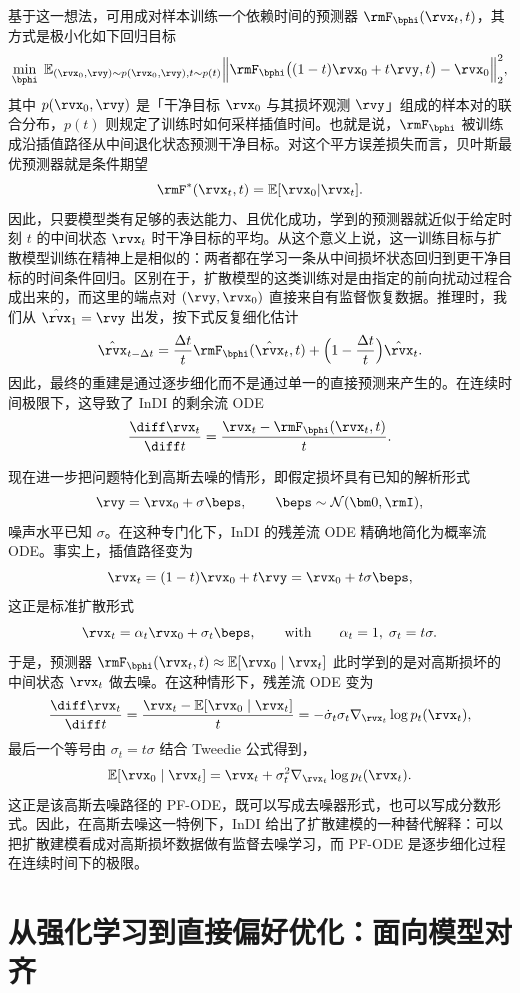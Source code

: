 基于这一想法，可用成对样本训练一个依赖时间的预测器 $\rmF_{\bphi}(\rvx_t,t)$，其方式是极小化如下回归目标
\[
\min_{\bphi}\;
\mathbb E_{(\rvx_0,\rvy)\sim p(\rvx_0,\rvy),  t\sim p(t)}
\Bigl\|
\rmF_{\bphi}\bigl((1-t)\rvx_0+t\rvy, t\bigr)-\rvx_0
\Bigr\|_2^2,
\]
其中 $p(\rvx_0,\rvy)$ 是「干净目标 $\rvx_0$ 与其损坏观测 $\rvy$」组成的样本对的联合分布，$p(t)$ 则规定了训练时如何采样插值时间。也就是说，$\rmF_{\bphi}$ 被训练成沿插值路径从中间退化状态预测干净目标。对这个平方误差损失而言，贝叶斯最优预测器就是条件期望
\[
\rmF^*(\rvx_t,t)=\mathbb E[\rvx_0|\rvx_t].
\]
因此，只要模型类有足够的表达能力、且优化成功，学到的预测器就近似于给定时刻 $t$ 的中间状态 $\rvx_t$ 时干净目标的平均。从这个意义上说，这一训练目标与扩散模型训练在精神上是相似的：两者都在学习一条从中间损坏状态回归到更干净目标的时间条件回归。区别在于，扩散模型的这类训练对是由指定的前向扰动过程合成出来的，而这里的端点对 $(\rvy,\rvx_0)$ 直接来自有监督恢复数据。推理时，我们从 $\hat{\rvx}_1=\rvy$ 出发，按下式反复细化估计
\[
\hat{\rvx}_{t-\Delta t}
=
\frac{\Delta t}{t}\rmF_{\bphi}(\hat{\rvx}_t,t)
+
\Bigl(1-\frac{\Delta t}{t}\Bigr)\hat{\rvx}_t.
\]
因此，最终的重建是通过逐步细化而不是通过单一的直接预测来产生的。在连续时间极限下，这导致了 InDI 的剩余流 ODE
\[
\frac{\diff \rvx_t}{\diff t}
=
\frac{\rvx_t-\rmF_{\bphi}(\rvx_t,t)}{t}.
\]

现在进一步把问题特化到高斯去噪的情形，即假定损坏具有已知的解析形式
\[
\rvy=\rvx_0+\sigma\beps,
\qquad \beps\sim\mathcal N(\bm 0,\rmI),
\]
噪声水平已知 \(\sigma\)。在这种专门化下，InDI 的残差流 ODE 精确地简化为概率流 ODE。事实上，插值路径变为
\[
\rvx_t=(1-t)\rvx_0+t\rvy
=
\rvx_0+t\sigma\beps,
\]
这正是标准扩散形式
\[
\rvx_t=\alpha_t\rvx_0+\sigma_t\beps,
\qquad\text{with}\qquad
\alpha_t=1,\;\sigma_t=t\sigma.
\]
于是，预测器 \(\rmF_{\bphi}(\rvx_t,t)\approx \mathbb E[\rvx_0\mid \rvx_t]\) 此时学到的是对高斯损坏的中间状态 \(\rvx_t\) 做去噪。在这种情形下，残差流 ODE 变为
\[
\frac{\diff \rvx_t}{\diff t}
=
\frac{\rvx_t-\mathbb E[\rvx_0\mid \rvx_t]}{t}
=
-\dot{\sigma}_t\sigma_t\nabla_{\rvx_t}\log p_t(\rvx_t),
\]
最后一个等号由 \(\sigma_t=t\sigma\) 结合 Tweedie 公式得到，
\[
\mathbb E[\rvx_0\mid \rvx_t]
=
\rvx_t+\sigma_t^2\nabla_{\rvx_t}\log p_t(\rvx_t).
\]
这正是该高斯去噪路径的 PF-ODE，既可以写成去噪器形式，也可以写成分数形式。因此，在高斯去噪这一特例下，InDI 给出了扩散建模的一种替代解释：可以把扩散建模看成对高斯损坏数据做有监督去噪学习，而 PF-ODE 是逐步细化过程在连续时间下的极限。


\section{从强化学习到直接偏好优化：面向模型对齐}\label{sec:rlhf-dpo}


